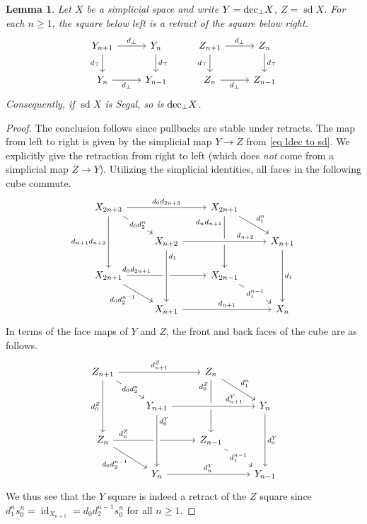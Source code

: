 \documentclass{conm-p-l}
\newtheorem{lemma}[theorem]{Lemma}
\theoremstyle{definition}
\theoremstyle{remark}
\newcommand{\ldec}{\textup{dec}_{\perp}}
\DeclareMathOperator{\sd}{sd}
\DeclareMathOperator{\id}{id}
\begin{document}
\begin{lemma}\label{lem ldec square as retract}
Let $X$ be a simplicial space and write $Y = \ldec X$, $Z = \sd X$. For each $n \geq 1$, the square below left is a retract of the square below right.
\[ \begin{tikzcd}
Y_{n+1} \rar{d_\bot} \dar[swap]{d_\top} & Y_n \dar{d_\top} 
& Z_{n+1} \rar{d_\bot} \dar[swap]{d_\top} & Z_n \dar{d_\top} 
\\
Y_n \rar[swap]{d_\bot} & Y_{n-1}
&
Z_n \rar[swap]{d_\bot} & Z_{n-1}
\end{tikzcd} \]
Consequently, if $\sd X$ is Segal, so is $\ldec X$.
\end{lemma}
\begin{proof}
The conclusion follows since pullbacks are stable under retracts.
The map from left to right is given by the simplicial map $Y \to Z$ from \eqref{eq ldec to sd}.
We explicitly give the retraction from right to left (which does \emph{not} come from a simplicial map $Z \to Y$).
Utilizing the simplicial identities, all faces in the following cube commute.
\[ \begin{tikzcd}
X_{2n+3} \ar[rr,"d_0d_{2n+3}"] \ar[dd,"d_{n+1}d_{n+2}"'] \ar[dr,"d_0d_2^n" description] & & 
X_{2n+1} \ar[dd, "d_nd_{n+1}"' very near start] \ar[dr,"d_1^n"]  \\
& 
X_{n+2} \ar[rr,"d_{n+2}" near end, crossing over] & & 
X_{n+1} \ar[dd,"d_1"] \\
X_{2n+1} \ar[rr,"d_0d_{2n+1}" very near start] \ar[dr,"d_0d_2^{n-1}"'] & & X_{2n-1} \ar[dr,"d_1^{n-1}" description] \\
& X_{n+1} \ar[rr,"d_{n+1}"] \ar[from=uu, crossing over, "d_1" very near start] & & X_n
\end{tikzcd} \]
In terms of the face maps of $Y$ and $Z$, the front and back faces of the cube are as follows.
\[ \begin{tikzcd}
Z_{n+1} \ar[rr,"d_{n+1}^Z"] \ar[dd,"d_0^Z"'] \ar[dr,"d_0d_2^n" description] & & 
Z_n \ar[dd, "d_0^Z"' very near start] \ar[dr,"d_1^n"]  \\
& 
Y_{n+1} \ar[rr,"d_{n+1}^Y" near end, crossing over] & & 
Y_n \ar[dd,"d_0^Y"] \\
Z_n \ar[rr,"d_n^Z" very near start] \ar[dr,"d_0d_2^{n-1}"'] & & Z_{n-1} \ar[dr,"d_1^{n-1}" description] \\
& Y_n \ar[rr,"d_n^Y"] \ar[from=uu, crossing over, "d_0^Y" very near start] & & Y_{n-1}
\end{tikzcd} \]
We thus see that the $Y$ square is indeed a retract of the $Z$ square since $d_1^n s_0^n = \id_{X_{n+1}} = d_0 d_2^{n-1} s_0^n$ for all $n\geq 1$.
\end{proof}
\end{document}
